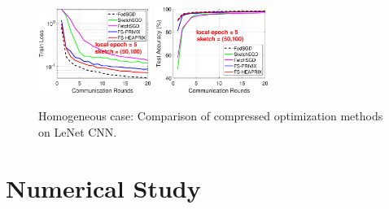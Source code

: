 \documentclass[11pt]{article}
\begin{document}
\begin{figure}[t]
\begin{center}
{		\includegraphics[width=1.45in]{MNIST_figures/local5_sketch50_iid1_train_loss.eps}\hspace{-0.12in}
		\includegraphics[width=1.45in]{MNIST_figures/local5_sketch50_iid1_test_acc.eps}
		}
	\end{center}
	\vspace{-0.1in}
	\caption{Homogeneous case: Comparison of compressed optimization methods on LeNet CNN.}
    \label{fig:MNIST-iid1}
    \vspace{-0.1in}
\end{figure}

\vspace{-0.15in}
\section{Numerical Study}\label{sec:experiment}
\vspace{-0.05in}
\end{document}
